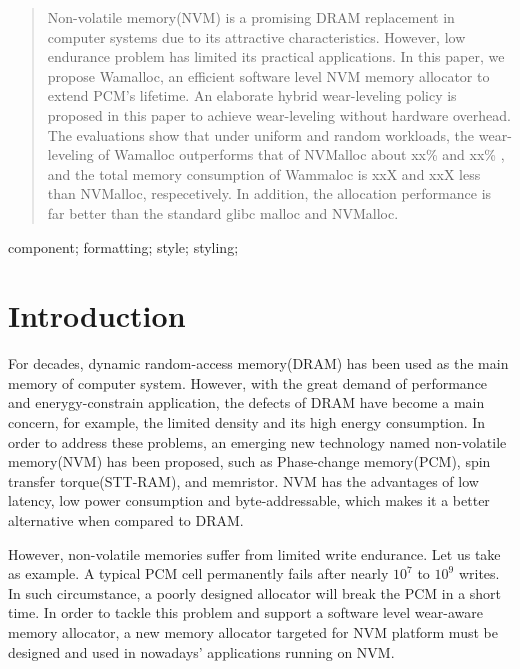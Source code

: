 \documentclass[10pt, conference, compsocconf]{IEEEtran}
\begin{document}




\maketitle


\begin{abstract}
Non-volatile memory(NVM) is a promising DRAM replacement in computer systems due to its attractive characteristics.
However, low endurance problem has limited its practical applications.
In this paper, we propose Wamalloc, an efficient software level NVM memory allocator to extend PCM's lifetime.
An elaborate hybrid wear-leveling policy is proposed in this paper to achieve wear-leveling without hardware overhead.
The evaluations show that under uniform and random workloads,
the wear-leveling of Wamalloc outperforms that of NVMalloc about xx\% and xx\% ,
and the total memory consumption of Wammaloc is xxX and xxX less than NVMalloc, respecetively.
In addition, the allocation performance is far better than the standard glibc malloc and NVMalloc.

\end{abstract}

\begin{IEEEkeywords}
component; formatting; style; styling;

\end{IEEEkeywords}

\section{Introduction}

For decades, dynamic random-access memory(DRAM) has been used as the main memory of computer system.
However, with the great demand of performance and enerygy-constrain application, the defects of DRAM have become a main concern,
for example, the limited density and its high energy consumption. 
In order to address these problems, an emerging new technology named non-volatile memory(NVM) has been proposed, such as Phase-change memory(PCM), spin transfer torque(STT-RAM), and memristor. 
NVM has the advantages of low latency, low power consumption and byte-addressable, which makes it a better alternative when compared  to DRAM.

However, non-volatile memories suffer from limited write endurance. 
Let us take  as example. A typical PCM cell permanently fails after nearly $10^7$ to $10^9$ writes. 
In such circumstance, a poorly designed allocator will break the PCM in a short time. 
In order to tackle this problem and support a software level wear-aware memory allocator, a new memory allocator targeted for NVM platform must be designed and used in nowadays’ applications running on NVM.
\end{document}
